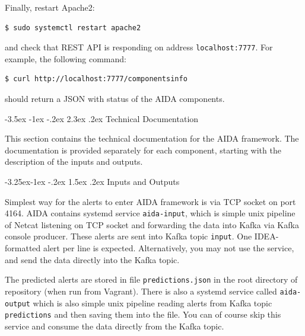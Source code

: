 \documentclass[a4paper]{article} %
\makeatletter
\renewcommand{\normalsize}{\fontsize{12}{15}\selectfont\color{textcolor}}
\renewcommand\section{\@startsection {section}{1}{\z@}%
                   {-3.5ex \@plus -1ex \@minus -.2ex}%
                   {2.3ex \@plus.2ex}%
                   {\normalfont\sffamily\Large\bfseries\color{projectcolor}}}
\renewcommand\subsection{\@startsection{subsection}{2}{\z@}%
                   {-3.25ex\@plus -1ex \@minus -.2ex}%
                   {1.5ex \@plus .2ex}%
                   {\normalfont\sffamily\large\bfseries\color{projectcolor}}}
\renewcommand\subsubsection{\@startsection{subsubsection}{3}{\z@}%
                   {-3.25ex\@plus -1ex \@minus -.2ex}%
                   {1.5ex \@plus .2ex}%
                   {\normalfont\sffamily\normalsize\bfseries\color{projectcolor}}}
\makeatother
\begin{document}
Finally, restart Apache2:
\begin{lstlisting}
$ sudo systemctl restart apache2
\end{lstlisting}
and check that REST API is responding on address \texttt{localhost:7777}. For example, the following command:
\begin{lstlisting}
$ curl http://localhost:7777/componentsinfo
\end{lstlisting}
should return a JSON with status of the AIDA components.

% 

\cleardoublepage

\section{Technical Documentation}

This section contains the technical documentation for the AIDA framework. The documentation is provided separately for each component, starting with the description of the inputs and outputs.

\subsection{Inputs and Outputs}

Simplest way for the alerts to enter AIDA framework is via TCP socket on port 4164. AIDA contains systemd service \texttt{aida-input}, which is simple unix pipeline of Netcat listening on TCP socket and forwarding the data into Kafka via Kafka console producer. These alerts are sent into Kafka topic \texttt{input}. One IDEA-formatted alert per line is expected. Alternatively, you may not use the service, and send the data directly into the Kafka topic.

The predicted alerts are stored in file \texttt{predictions.json} in the root directory of repository (when run from Vagrant). There is also a  systemd service called \texttt{aida-output} which is also simple unix pipeline reading alerts from Kafka topic \texttt{predictions} and then saving them into the file. You can of course skip this service and consume the data directly from the Kafka topic.

\end{document}
